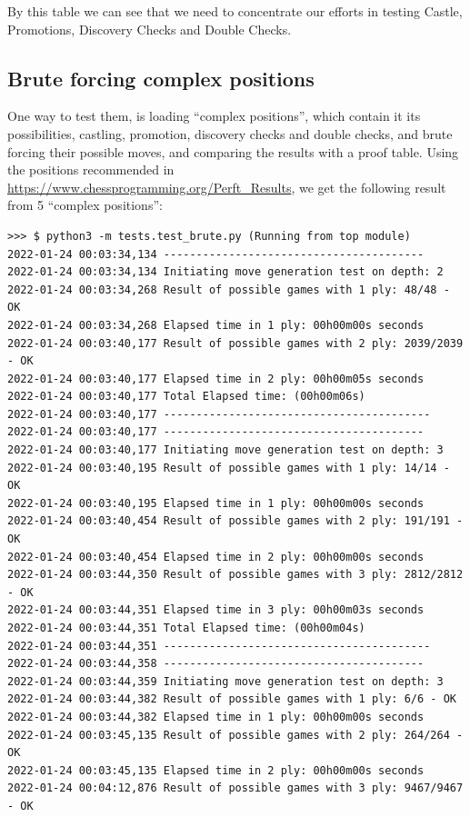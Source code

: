 \documentclass[10pt]{article}
\begin{document}
By this table we can see that we need to concentrate our efforts in testing
Castle, Promotions, Discovery Checks and Double Checks.

\subsection{Brute forcing complex positions}


One way to test them, is loading ``complex positions'', which contain it its
possibilities, castling, promotion, discovery checks and double checks, and brute forcing their
possible moves, and comparing the results with a proof table. Using the
positions recommended in \url{https://www.chessprogramming.org/Perft_Results},
we get the following result from 5 ``complex positions'':

\begin{lstlisting}
>>> $ python3 -m tests.test_brute.py (Running from top module)
2022-01-24 00:03:34,134 ----------------------------------------
2022-01-24 00:03:34,134 Initiating move generation test on depth: 2
2022-01-24 00:03:34,268 Result of possible games with 1 ply: 48/48 - OK
2022-01-24 00:03:34,268 Elapsed time in 1 ply: 00h00m00s seconds
2022-01-24 00:03:40,177 Result of possible games with 2 ply: 2039/2039 - OK
2022-01-24 00:03:40,177 Elapsed time in 2 ply: 00h00m05s seconds
2022-01-24 00:03:40,177 Total Elapsed time: (00h00m06s)
2022-01-24 00:03:40,177 -----------------------------------------
2022-01-24 00:03:40,177 ----------------------------------------
2022-01-24 00:03:40,177 Initiating move generation test on depth: 3
2022-01-24 00:03:40,195 Result of possible games with 1 ply: 14/14 - OK
2022-01-24 00:03:40,195 Elapsed time in 1 ply: 00h00m00s seconds
2022-01-24 00:03:40,454 Result of possible games with 2 ply: 191/191 - OK
2022-01-24 00:03:40,454 Elapsed time in 2 ply: 00h00m00s seconds
2022-01-24 00:03:44,350 Result of possible games with 3 ply: 2812/2812 - OK
2022-01-24 00:03:44,351 Elapsed time in 3 ply: 00h00m03s seconds
2022-01-24 00:03:44,351 Total Elapsed time: (00h00m04s)
2022-01-24 00:03:44,351 -----------------------------------------
2022-01-24 00:03:44,358 ----------------------------------------
2022-01-24 00:03:44,359 Initiating move generation test on depth: 3
2022-01-24 00:03:44,382 Result of possible games with 1 ply: 6/6 - OK
2022-01-24 00:03:44,382 Elapsed time in 1 ply: 00h00m00s seconds
2022-01-24 00:03:45,135 Result of possible games with 2 ply: 264/264 - OK
2022-01-24 00:03:45,135 Elapsed time in 2 ply: 00h00m00s seconds
2022-01-24 00:04:12,876 Result of possible games with 3 ply: 9467/9467 - OK

\end{lstlisting}
\end{document}
